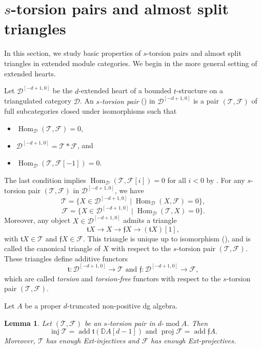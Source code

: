 \documentclass[11pt,a4paper,reqno]{amsart}
\theoremstyle{plain}
\newtheorem{lemma}[theorem]{Lemma}
\numberwithin{equation}{section}
\theoremstyle{definition}
\providecommand{\add}{\operatorname{add}}
\renewcommand{\mod}{\operatorname{mod}}
\newcommand{\Hom}{\operatorname{Hom}}
\newcommand{\Proj}{\operatorname{proj}}
\newcommand{\Inj}{\operatorname{inj}}
\newcommand{\emod}[2]{#1\text{-}\!\mod #2}
\newcommand{\eheart}[2]{#2^{[-#1+1,0]}}
\newcommand{\D}{\mathcal{D}}
\newcommand{\T}{\mathcal{T}}
\newcommand{\F}{\mathcal{F}}
\begin{document}
\section{\texorpdfstring{$s$}{s}-torsion pairs and almost split triangles}\label{sec:s-tor}

In this section, we study basic properties of $s$-torsion pairs and almost split triangles in extended module categories. We begin in the more general setting of extended hearts.

Let $\eheart{d}{\D}$ be the $d$-extended heart of a bounded $t$-structure on a triangulated category $\D$. An \emph{$s$-torsion pair} (\cite[Definition~3.1]{AET}) in $\eheart{d}{\D}$ is a pair $(\T,\F)$ of full subcategories closed under isomorphisms such that 
\begin{itemize}
    \item $\Hom_{\D}(\T,\F)=0$,
    \item $\eheart{d}{\D}=\T*\F$, and
    \item $\Hom_{\D}(\T,\F[-1])=0$.
\end{itemize}
The last condition implies $\Hom_{\D}(\T,\F[i])=0$ for all $i<0$ by \cite[Corollary~1.10]{Z}. For any $s$-torsion pair $(\T,\F)$ in $\eheart{d}{\D}$, we have 
\[\T=\{X\in\eheart{d}{\D}\mid \Hom_{\D}(X,\F)=0\},\]
\[\F=\{X\in\eheart{d}{\D}\mid \Hom_{\D}(\T,X)=0\}.\]
Moreover, any object $X\in\eheart{d}{\D}$ admits a triangle
\begin{equation}\label{eq:torsion-triangle}
 \mathfrak{t}X\to X\to \mathfrak{f}X\to(\mathfrak{t}X)[1],
\end{equation}
with $\mathfrak{t}X\in\T$ and $\mathfrak{f}X\in\F$. This triangle is unique up to isomorphism (\cite[Proposition 3.7]{AET}), and is called the canonical triangle of $X$ with respect to the $s$-torsion pair $(\T,\F)$. These triangles define additive functors
\begin{equation}\label{eq:tor-functors}
    \mathfrak{t}:\eheart{d}{\D}\to\T\text{ and }\mathfrak{f}:\eheart{d}{\D}\to\F,
\end{equation}
which are called \emph{torsion} and \emph{torsion-free} functors with respect to the $s$-torsion pair $(\T,\F)$.

Let $A$ be a proper $d$-truncated non-positive dg algebra.

\begin{lemma}\label{lem:torsion-Ext-inj}
Let $(\T,\F)$ be an $s$-torsion pair in
$\emod{d}{A}$. Then
\[
 \Inj\T
 =\add\mathfrak{t}(\mathbb D A[d-1])\text{ and }
 \Proj\F=\add\mathfrak{f} A.
\]
Moreover, $\T$ has enough Ext-injectives and $\F$ has enough Ext-projectives.
\end{lemma}
\end{document}

